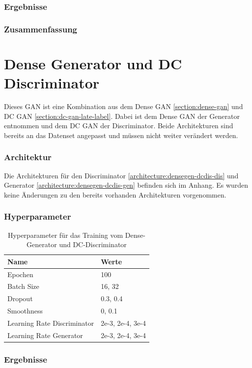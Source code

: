 \subsubsection{Ergebnisse}
\subsubsection{Zusammenfassung}

\section{Dense Generator und DC Discriminator}
Dieses GAN ist eine Kombination aus dem Dense GAN \cref{section:dense-gan} und DC GAN \cref{section:dc-gan-late-label}.
Dabei ist dem Dense GAN der Generator entnommen und dem DC GAN der Discriminator.
Beide Architekturen sind bereits an das Datenset angepasst und müssen nicht weiter verändert werden.

\subsubsection{Architektur}
Die Architekturen für den Discriminator \cref{architecture:densegen-dcdis-dis} und Generator \cref{architecture:densegen-dcdis-gen} befinden sich im Anhang.
Es wurden keine Änderungen zu den bereits vorhanden Architekturen vorgenommen.

\subsubsection{Hyperparameter}
\begin{table}[H]
	\centering
	\begin{tabular}{l l}
		Name                        & Werte            \\ \hline
		Epochen                     & 100              \\
		Batch Size                  & 16, 32           \\
		Dropout                     & 0.3, 0.4         \\
		Smoothness                  & 0, 0.1           \\
		Learning Rate Discriminator & 2e-3, 2e-4, 3e-4 \\
		Learning Rate Generator     & 2e-3, 2e-4, 3e-4
	\end{tabular}
	\caption{Hyperparameter für das Training vom Dense-Generator und DC-Discriminator}
\end{table}
\subsubsection{Ergebnisse}
